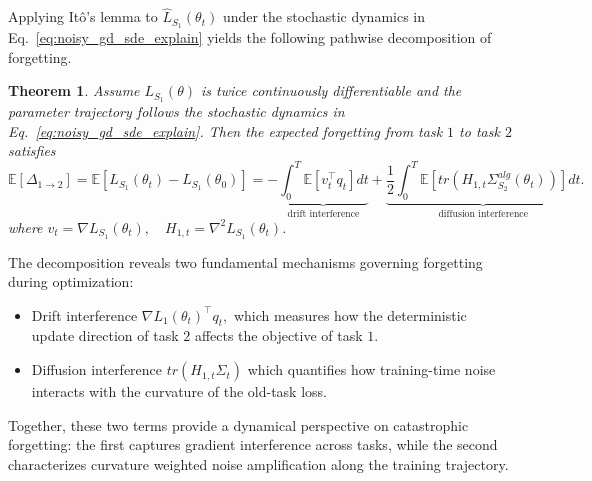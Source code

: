 \documentclass{article}
\newtheorem{theorem}{Theorem}
\begin{document}
Applying Itô's lemma to $\hat L_{S_1}(\theta_t)$ under the stochastic dynamics in Eq.~\eqref{eq:noisy_gd_sde_explain} yields the following pathwise decomposition of forgetting.



\begin{theorem}
    Assume $L_{S_1}(\theta)$ is twice continuously differentiable and the parameter trajectory follows the stochastic dynamics in Eq.~\eqref{eq:noisy_gd_sde_explain}. Then the expected forgetting from task $1$ to task $2$ satisfies
    \begin{equation}
    \mathbb{E}[\Delta_{1\rightarrow 2}]=
\mathbb{E}[L_{S_1}(\theta_t)-L_{S_1}(\theta_0)]
=
- \underbrace{\int_0^T
\mathbb{E}[v_t^\top q_t]dt}_{\text{drift interference}}
+
\underbrace{\frac12
\int_0^T
\mathbb{E}[tr\left(H_{1,t}\Sigma^{alg}_{S_2}(\theta_t)\right)]dt}_{\text{diffusion interference}} .
\label{eq: current task forgetting}
\end{equation} 
where $v_t=\nabla L_{S_1}(\theta_t),\quad H_{1,t}=\nabla^2 L_{S_1}(\theta_t)$. 
\end{theorem}

The decomposition reveals two fundamental mechanisms governing forgetting during optimization:
\begin{itemize}
    \item  Drift interference $\nabla L_1(\theta_t)^\top q_t ,$ which measures how the deterministic update direction of task $2$ affects the objective of task $1$.
    \item Diffusion interference $tr(H_{1,t}\Sigma_t)$ which quantifies how training-time noise interacts with the curvature of the old-task loss.
\end{itemize} 
Together, these two terms provide a dynamical perspective on catastrophic forgetting: the first captures gradient interference across tasks, while the second characterizes curvature weighted noise amplification along the training trajectory.
\end{document}

